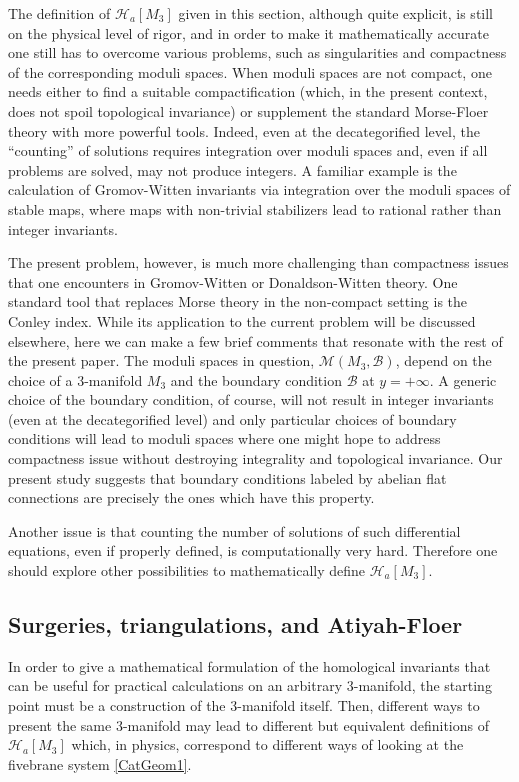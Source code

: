 \documentclass[hyper,letterpaper]{JHEP3}
\def\CB{{\mathcal B}}
\def\CH{{\mathcal H}}
\def\CM{{\mathcal M}}
\begin{document}
The definition of $\CH_a[M_3]$ given in this section, although quite explicit, is still on the physical level of rigor, and in order to make it mathematically accurate one still has to overcome various problems, such as singularities and compactness of the corresponding moduli spaces. When moduli spaces are not compact, one needs either to find a suitable compactification (which, in the present context, does not spoil topological invariance) or supplement the standard Morse-Floer theory with more powerful tools. Indeed, even at the decategorified level, the ``counting'' of solutions requires integration over moduli spaces and, even if all problems are solved, may not produce integers. A familiar example is the calculation of Gromov-Witten invariants via integration over the moduli spaces of stable maps, where maps with non-trivial stabilizers lead to rational rather than integer invariants.

The present problem, however, is much more challenging than compactness issues that one encounters in Gromov-Witten or Donaldson-Witten theory. One standard tool that replaces Morse theory in the non-compact setting is the Conley index. While its application to the current problem will be discussed elsewhere, here we can make a few brief comments that resonate with the rest of the present paper. The moduli spaces in question, $\CM (M_3, \CB)$, depend on the choice of a 3-manifold $M_3$ and the boundary condition $\CB$ at $y = + \infty$. A generic choice of the boundary condition, of course, will not result in integer invariants (even at the decategorified level) and only particular choices of boundary conditions will lead to moduli spaces where one might hope to address compactness issue without destroying integrality and topological invariance. Our present study suggests that boundary conditions labeled by abelian flat connections are precisely the ones which have this property.

Another issue is that counting the number of solutions of such differential equations, even if properly defined, is computationally very hard. Therefore one should explore other possibilities to mathematically define $\CH_a[M_3]$.

\subsection{Surgeries, triangulations, and Atiyah-Floer}

In order to give a mathematical formulation of the homological invariants
that can be useful for practical calculations on an arbitrary 3-manifold,
the starting point must be a construction of the 3-manifold itself.
%
Then, different ways to present the same 3-manifold may lead to different but
equivalent definitions of $\CH_a[M_3]$ which, in physics, correspond to different ways
of looking at the fivebrane system \eqref{CatGeom1}.
\end{document}
